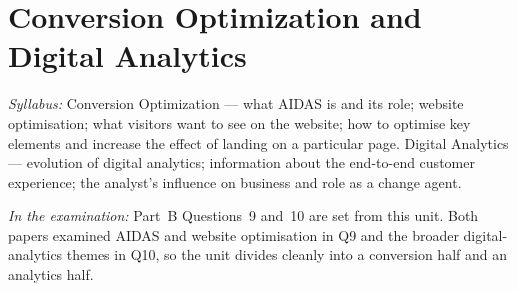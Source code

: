 \chapter{Conversion Optimization and Digital Analytics}

\textit{Syllabus:} Conversion Optimization --- what AIDAS is and its role;
website optimisation; what visitors want to see on the website; how to optimise
key elements and increase the effect of landing on a particular page. Digital
Analytics --- evolution of digital analytics; information about the end-to-end
customer experience; the analyst's influence on business and role as a change
agent.

\textit{In the examination:} Part~B Questions~9 and~10 are set from this unit.
Both papers examined AIDAS and website optimisation in Q9 and the broader
digital-analytics themes in Q10, so the unit divides cleanly into a conversion
half and an analytics half.

\parta

